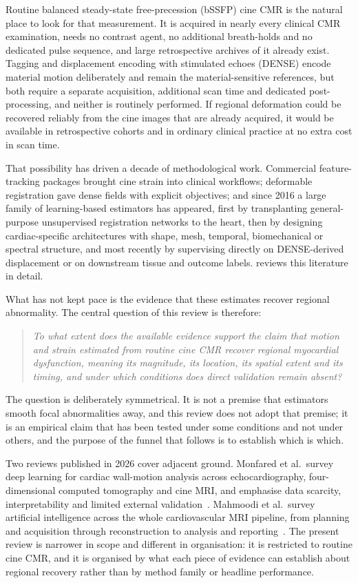 Routine balanced steady-state free-precession (bSSFP) cine CMR is the natural place to look for that
measurement. It is acquired in nearly every clinical CMR examination, needs no contrast agent, no
additional breath-holds and no dedicated pulse sequence, and large retrospective archives of it
already exist. Tagging and displacement encoding with stimulated echoes (DENSE) encode material
motion deliberately and remain the material-sensitive references, but both require a separate
acquisition, additional scan time and dedicated post-processing, and neither is routinely performed.
If regional deformation could be recovered reliably from the cine images that are already acquired,
it would be available in retrospective cohorts and in ordinary clinical practice at no extra cost in
scan time.

That possibility has driven a decade of methodological work. Commercial feature-tracking packages
brought cine strain into clinical workflows; deformable registration gave dense fields with explicit
objectives; and since 2016 a large family of learning-based estimators has appeared, first by
transplanting general-purpose unsupervised registration networks to the heart, then by designing
cardiac-specific architectures with shape, mesh, temporal, biomechanical or spectral structure, and
most recently by supervising directly on DENSE-derived displacement or on downstream tissue and
outcome labels.  reviews this literature in detail.

What has not kept pace is the evidence that these estimates recover regional abnormality. The
central question of this review is therefore:

\begin{quote}
\emph{To what extent does the available evidence support the claim that motion and strain estimated
from routine cine CMR recover regional myocardial dysfunction, meaning its magnitude, its location,
its spatial extent and its timing, and under which conditions does direct validation remain absent?}
\end{quote}

The question is deliberately symmetrical. It is not a premise that estimators smooth focal
abnormalities away, and this review does not adopt that premise; it is an empirical claim that has
been tested under some conditions and not under others, and the purpose of the funnel that follows
is to establish which is which.

Two reviews published in 2026 cover adjacent ground. Monfared et al.\ survey deep learning for
cardiac wall-motion analysis across echocardiography, four-dimensional computed tomography and cine
MRI, and emphasise data scarcity, interpretability and limited external
validation~\citep{monfared2026}. Mahmoodi et al.\ survey artificial intelligence across the whole
cardiovascular MRI pipeline, from planning and acquisition through reconstruction to analysis and
reporting~\citep{mahmoodi2026}. The present review is narrower in scope and different in
organisation: it is restricted to routine cine CMR, and it is organised by what each piece of
evidence can establish about regional recovery rather than by method family or headline performance.

